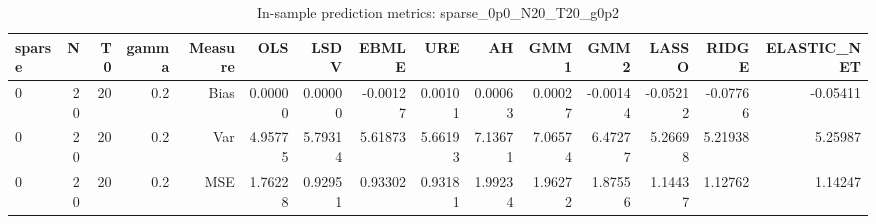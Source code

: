 \begin{table}[!htbp]\centering
\caption{In-sample prediction metrics: sparse_0p0_N20_T20_g0p2}
\label{tab:table2_sparse_0p0_N20_T20_g0p2}
\begin{tabular}{lrrrrrrrrrrrrrr}
\hline
sparse & N & T0 & gamma & Measure & OLS & LSDV & EBMLE & URE & AH & GMM1 & GMM2 & LASSO & RIDGE & ELASTIC_NET \\
\hline
0 & 20 & 20 & 0.2 & Bias & 0.00000 & 0.00000 & -0.00127 & 0.00101 & 0.00063 & 0.00027 & -0.00144 & -0.05212 & -0.07766 & -0.05411 \\
0 & 20 & 20 & 0.2 & Var & 4.95775 & 5.79314 & 5.61873 & 5.66193 & 7.13671 & 7.06574 & 6.47277 & 5.26698 & 5.21938 & 5.25987 \\
0 & 20 & 20 & 0.2 & MSE & 1.76228 & 0.92951 & 0.93302 & 0.93181 & 1.99234 & 1.96272 & 1.87556 & 1.14437 & 1.12762 & 1.14247 \\
\hline
\end{tabular}
\end{table}

